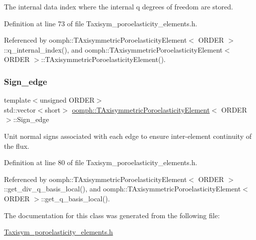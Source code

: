 The internal data index where the internal q degrees of freedom are stored. 



Definition at line 73 of file Taxisym\+\_\+poroelasticity\+\_\+elements.\+h.



Referenced by oomph\+::\+T\+Axisymmetric\+Poroelasticity\+Element$<$ O\+R\+D\+E\+R $>$\+::q\+\_\+internal\+\_\+index(), and oomph\+::\+T\+Axisymmetric\+Poroelasticity\+Element$<$ O\+R\+D\+E\+R $>$\+::\+T\+Axisymmetric\+Poroelasticity\+Element().

\mbox{\label{classoomph_1_1TAxisymmetricPoroelasticityElement_a19992fa82fa97f7f16aad3209d8bd8a0}} 
\subsubsection{\texorpdfstring{Sign\+\_\+edge}{Sign\_edge}}
{\footnotesize\ttfamily template$<$unsigned O\+R\+D\+ER$>$ \\
std\+::vector$<$short$>$ \hyperlink{classoomph_1_1TAxisymmetricPoroelasticityElement}{oomph\+::\+T\+Axisymmetric\+Poroelasticity\+Element}$<$ O\+R\+D\+ER $>$\+::Sign\+\_\+edge\hspace{0.3cm}{\ttfamily [private]}}



Unit normal signs associated with each edge to ensure inter-\/element continuity of the flux. 



Definition at line 80 of file Taxisym\+\_\+poroelasticity\+\_\+elements.\+h.



Referenced by oomph\+::\+T\+Axisymmetric\+Poroelasticity\+Element$<$ O\+R\+D\+E\+R $>$\+::get\+\_\+div\+\_\+q\+\_\+basis\+\_\+local(), and oomph\+::\+T\+Axisymmetric\+Poroelasticity\+Element$<$ O\+R\+D\+E\+R $>$\+::get\+\_\+q\+\_\+basis\+\_\+local().



The documentation for this class was generated from the following file\+:\begin{DoxyCompactItemize}
\item 
\hyperlink{Taxisym__poroelasticity__elements_8h}{Taxisym\+\_\+poroelasticity\+\_\+elements.\+h}\end{DoxyCompactItemize}
